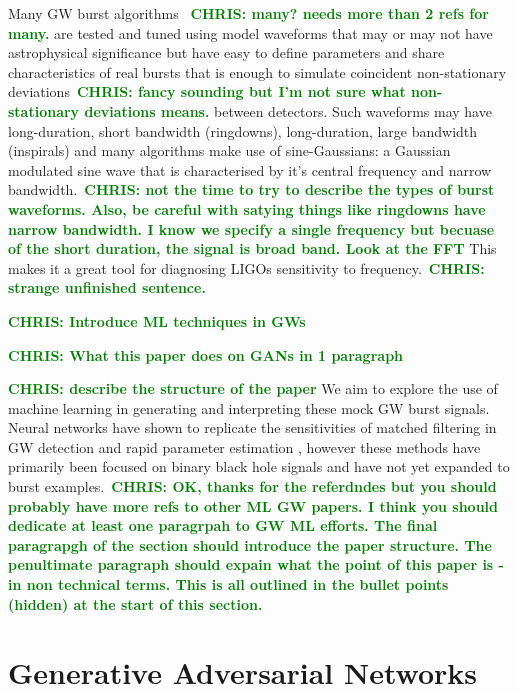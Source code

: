 \documentclass[12pt]{iopart}
\newcommand{\chris}[1]{\textbf{\textcolor{green}{CHRIS: #1}}}
\begin{document}
%
Many \ac{GW} burst algorithms \cite{Klimenko_2008, Aso_2008}~\chris{many? needs
more than 2 refs for many.} are tested and tuned using model waveforms that may
or may not have astrophysical significance but have easy to define parameters
and share characteristics of real bursts that is enough to simulate coincident
non-stationary deviations~\chris{fancy sounding but I'm not sure what
non-stationary deviations means.} between detectors. Such waveforms may have
long-duration, short bandwidth (ringdowns), long-duration, large bandwidth
(inspirals) and many algorithms make use of sine-Gaussians: a Gaussian
modulated sine wave that is characterised by it's central frequency and narrow
bandwidth.~\chris{not the time to try to describe the types of burst waveforms.
Also, be careful with satying things like ringdowns have narrow bandwidth. I
know we specify a single frequency but becuase of the short duration, the
signal is broad band. Look at the FFT} This makes it a great tool for
diagnosing LIGOs sensitivity to frequency.~\chris{strange unfinished sentence.} 

%
\chris{Introduce ML techniques in GWs}

%
\chris{What this paper does on GANs in 1 paragraph}

%
\chris{describe the structure of the paper}
We aim to explore the use of machine learning in generating and interpreting
these mock \ac{GW} burst signals. Neural networks have shown to replicate the
sensitivities of matched filtering in \ac{GW} detection \cite{Gabbard2017} and rapid
parameter estimation \cite{gabbard2019bayesian}, however these methods have
primarily been focused on binary black hole signals and have not yet expanded
to burst examples.~\chris{OK, thanks for the referdndes but you should probably
have more refs to other ML GW papers. I think you should dedicate at least one
paragrpah to GW ML efforts. The final paragrapgh of the section should
introduce the paper structure. The penultimate paragraph should expain what the
point of this paper is - in non technical terms. This is all outlined in the
bullet points (hidden) at the start of this section.} 

\section{Generative Adversarial Networks}
\end{document}
